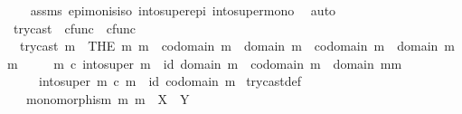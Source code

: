 \begin{isabellebody}
%
\isadelimproof
\ \ %
\endisadelimproof
%
\isatagproof
{}\isamarkupfalse%
\ assms\ epi{\isacharunderscore}{\kern0pt}mon{\isacharunderscore}{\kern0pt}is{\isacharunderscore}{\kern0pt}iso\ into{\isacharunderscore}{\kern0pt}super{\isacharunderscore}{\kern0pt}epi\ into{\isacharunderscore}{\kern0pt}super{\isacharunderscore}{\kern0pt}mono\ \isamarkupfalse%
\ auto%
\endisatagproof
{\isafoldproof}%
%
\isadelimproof
%
\endisadelimproof
%
\isadelimdocument
%
\endisadelimdocument
%
\isatagdocument
%
\isamarkuptrue%
%
\endisatagdocument
{\isafolddocument}%
%
\isadelimdocument
%
\endisadelimdocument
{}\isamarkupfalse%
\ try{\isacharunderscore}{\kern0pt}cast\ {\isacharcolon}{\kern0pt}{\isacharcolon}{\kern0pt}\ {\isachardoublequoteopen}cfunc\ {\isasymRightarrow}\ cfunc{\isachardoublequoteclose}\ \isanewline
\ \ {\isachardoublequoteopen}try{\isacharunderscore}{\kern0pt}cast\ m\ {\isacharequal}{\kern0pt}\ {\isacharparenleft}{\kern0pt}THE\ m{\isacharprime}{\kern0pt}{\isachardot}{\kern0pt}\ m{\isacharprime}{\kern0pt}\ {\isacharcolon}{\kern0pt}\ codomain\ m\ {\isasymrightarrow}\ domain\ m\ {\isasymCoprod}\ {\isacharparenleft}{\kern0pt}{\isacharparenleft}{\kern0pt}codomain\ m{\isacharparenright}{\kern0pt}\ {\isasymsetminus}\ {\isacharparenleft}{\kern0pt}{\isacharparenleft}{\kern0pt}domain\ m{\isacharparenright}{\kern0pt}{\isacharcomma}{\kern0pt}m{\isacharparenright}{\kern0pt}{\isacharparenright}{\kern0pt}\isanewline
\ \ \ \ {\isasymand}\ m{\isacharprime}{\kern0pt}\ {\isasymcirc}\isactrlsub c\ into{\isacharunderscore}{\kern0pt}super\ m\ {\isacharequal}{\kern0pt}\ id\ {\isacharparenleft}{\kern0pt}domain\ m\ {\isasymCoprod}\ {\isacharparenleft}{\kern0pt}codomain\ m\ {\isasymsetminus}\ {\isacharparenleft}{\kern0pt}{\isacharparenleft}{\kern0pt}domain\ m{\isacharparenright}{\kern0pt}{\isacharcomma}{\kern0pt}m{\isacharparenright}{\kern0pt}{\isacharparenright}{\kern0pt}{\isacharparenright}{\kern0pt}\isanewline
\ \ \ \ {\isasymand}\ into{\isacharunderscore}{\kern0pt}super\ m\ {\isasymcirc}\isactrlsub c\ m{\isacharprime}{\kern0pt}\ {\isacharequal}{\kern0pt}\ id\ {\isacharparenleft}{\kern0pt}codomain\ m{\isacharparenright}{\kern0pt}{\isacharparenright}{\kern0pt}{\isachardoublequoteclose}\isanewline
\isanewline
{}\isamarkupfalse%
\ try{\isacharunderscore}{\kern0pt}cast{\isacharunderscore}{\kern0pt}def{}{\isacharcolon}{\kern0pt}\isanewline
\ \ \ {\isachardoublequoteopen}monomorphism\ m{\isachardoublequoteclose}\ {\isachardoublequoteopen}m\ {\isacharcolon}{\kern0pt}\ X\ {\isasymrightarrow}\ Y{\isachardoublequoteclose}\isanewline

\end{isabellebody}
